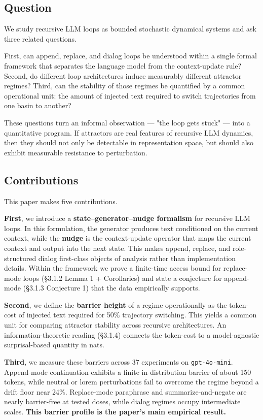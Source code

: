 \documentclass{article}
\theoremstyle{plain}
\theoremstyle{definition}
\begin{document}
\subsection{Question}

We study recursive LLM loops as bounded stochastic dynamical systems
and ask three related questions.

First, can append, replace, and dialog loops be understood within a
single formal framework that separates the language model from the
context-update rule? Second, do different loop architectures induce
measurably different attractor regimes? Third, can the stability of
those regimes be quantified by a common operational unit: the amount
of injected text required to switch trajectories from one basin to
another?

These questions turn an informal observation — "the loop gets stuck"
— into a quantitative program. If attractors are real features of
recursive LLM dynamics, then they should not only be detectable in
representation space, but should also exhibit measurable resistance
to perturbation.

\subsection{Contributions}

This paper makes five contributions.

\textbf{First}, we introduce a \textbf{state–generator–nudge formalism} for
recursive LLM loops. In this formulation, the generator produces text
conditioned on the current context, while the \textbf{nudge} is the
context-update operator that maps the current context and output
into the next state. This makes append, replace, and role-structured
dialog first-class objects of analysis rather than implementation
details. Within the framework we prove a finite-time access bound for
replace-mode loops (§3.1.2 Lemma 1 + Corollaries) and state a
conjecture for append-mode (§3.1.3 Conjecture 1) that the data
empirically supports.

\textbf{Second}, we define the \textbf{barrier height} of a regime
operationally as the token-cost of injected text required for 50\%
trajectory switching. This yields a common unit for comparing
attractor stability across recursive architectures. An
information-theoretic reading (§3.1.4) connects the token-cost to a
model-agnostic surprisal-based quantity in nats.

\textbf{Third}, we measure these barriers across 37 experiments on
\texttt{gpt-4o-mini}. Append-mode continuation exhibits a finite
in-distribution barrier of about 150 tokens, while neutral or lorem
perturbations fail to overcome the regime beyond a drift floor near
24\%. Replace-mode paraphrase and summarize-and-negate are nearly
barrier-free at tested doses, while dialog regimes occupy
intermediate scales. \textbf{This barrier profile is the paper's main
empirical result.}
\end{document}
